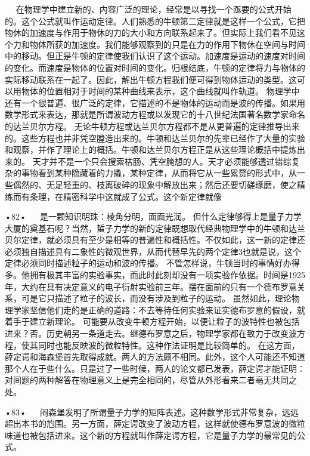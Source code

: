   
在物理学中建立新的、内容广泛的理论，经常是以寻找一个亟要的公式开始的。这个公式就叫作运动定律。人们熟悉的牛顿第二定律就是这样一个公式，它把物休的加速度与作用于物休的力的大小和方向联系起来了。但实际上我们看不见这个力和物体所获的加速度。我们能够观察到的只是在力的作用下物休在空间与时间中的移动。但正是牛顿的定律使我们认识了这个运动。加速度是运动的速度对时间的变化。而速度是物体的位置对时间的变化。归根结底，牛顿的定律将力与物体的实际移动联系在一起了。因此，解出牛顿方程我们便可得到物体运动的类型。这可以用物体的位置相对于时间的某种曲线来表示，这个曲线就叫作轨道。
物理学中还有一个很普遍、很广泛的定律，它描述的不是物体的运动而是波的传播。如果用数学形式来表达，那就是所谓波动方程或以发现它的十八世纪法国著名数学家命名的达兰贝尔方程。
无论牛顿方程或达兰贝尔方程都不是从更普遍的定律推导出来的。这些方程也并非凭空膛造出来的。牛顿和达兰贝尔的先辈已经作了大量的实验和观察，并作了理论上的概括。牛顿和达兰贝尔方程正是从这些理论概括中提炼出来的。
天才并不是一个只会搜索枯肠、凭空腌想的人。天才必须能够透过错综复杂的事物看到某种隐藏着的力撬，某种定律，从而将它从一些累赘的形式中，从一些偶然的、无足轻重的、枝离破碎的现象中解放出来；然后还要切磋琢磨，使之精练而有条理，在精密科学中这就成了公式。这个新定律就像

•82•
  
是一颗知识明珠：棱角分明，面面光润。
但什么定律够得上是量子力学大厦的奠基石呢？当然，蜇子力学的新的定律既想取代经典物理学中的牛顿和达兰贝尔定律，就必须具有至少是相等的普遍性和概括性。不仅如此，这一新的定律还必须独自描述具有二象性的微观世界，从而代替早先的两个定律3也就是说，这个定律必须同时描述粒子的运动和波的传播。
不管怎样说，牛顿当时的事情好办得多。他拥有极其丰富的实验事实，而此时此刻却没有一项实验作依据。时间是1925年，大约在具有决定意义的电子衍射实验前三年。摆在面前的只有一个德布罗意关系，可是它只描述了粒子的波长，而没有涉及到粒子的运动。
虽然如此，理论物理学家坚信他们走的是正确的道路：不去等待任何实验来证实德布罗意的假设，就着手于建立新理论。
可能要从改变牛顿方程开始，以便让粒子的波特性也被包括进来？否。历史朝另一条道走去。继德布罗意之后，物理学家都在致力于改变波方程，使其同时也能反映波的微粒特性。这种作法证明是比较简单的。
在这方面，薛定谔和海森堡首先取得成就。两人的方法颇不相同。此外，这个人可能还不知道那个人在于些什么。只是过了一些时候，两人的论文都已发表，薛定谔才能证明：对间题的两种解答在物理意义上是完全相同的，尽管从外形看来二者亳无共同之处。

•83•
  
闷森堡发明了所谓量子力学的矩阵表述。这种数学形式非常复杂，远远超出本书的尥围。另一方面，薛定谔改变了波动方程，这样就使德布罗意波的微粒味道也被包括进来。这个新的方程就叫作薛定谔方程，它是量子力学的最常见的公式。

